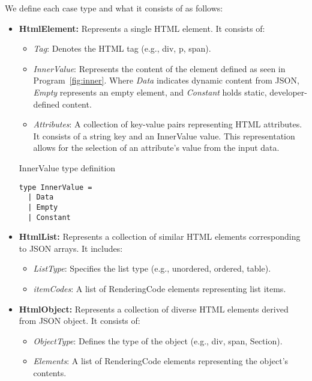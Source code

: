 We define each case type and what it consists of as follows:
\begin{itemize}
	\item \textbf{HtmlElement:} Represents a single HTML element. It consists of:
	      \begin{itemize}
		      \item \emph{Tag}: Denotes the HTML tag (e.g., div, p, span). \item \emph{InnerValue}: Represents the content of the element defined as seen in Program~\ref{fig:inner}.
		            Where \emph{Data} indicates dynamic content from JSON, \emph{Empty} represents an empty element, and \emph{Constant} holds static, developer-defined content.
		      \item {\emph{Attributes}: A collection of key-value pairs representing HTML attributes.
		            It consists of a string key and an InnerValue value. This representation allows for the selection of an attribute's value from the input data.
		            }

	      \end{itemize}
	      \begin{listing}[htbp]
		      \caption{InnerValue type definition}
		      \label{fig:inner}
		      \begin{lstlisting}
type InnerValue =
  | Data 
  | Empty
  | Constant

                  \end{lstlisting}
	      \end{listing}

	\item \textbf{HtmlList:} Represents a collection of similar HTML elements corresponding to JSON arrays. It includes:
	      \begin{itemize}
		      \item \emph{ListType}: Specifies the list type (e.g., unordered, ordered, table).
		      \item \emph{itemCodes}: A list of RenderingCode elements representing list items.

	      \end{itemize}

	\item \textbf{HtmlObject:} Represents a collection of diverse HTML elements derived from JSON object. It consists of:
	      \begin{itemize}
		      \item \emph{ObjectType}: Defines the type of the object (e.g., div, span, Section).
		      \item \emph{Elements}: A list of RenderingCode elements representing the object's contents.
	      \end{itemize}


\end{itemize}

